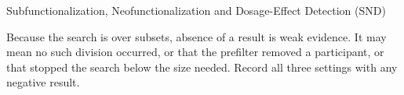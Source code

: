 \begin{recipe}[label=rec:snd]{Subfunctionalization, Neofunctionalization and
  Dosage-Effect Detection (SND)}
\begin{interpretation}
  Because the search is over subsets, absence of a result is weak evidence. It
  may mean no such division occurred, or that the prefilter removed a
  participant, or that  stopped the search below the
  size needed. Record all three settings with any negative result.
\end{interpretation}

\begin{references}
\end{references}

\end{recipe}
